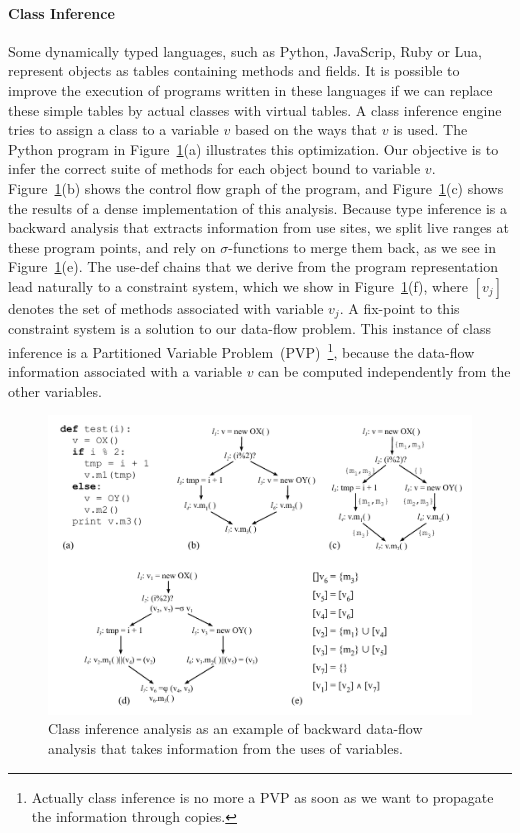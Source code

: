 \paragraph{Class Inference} Some dynamically typed languages, such as Python, Java\-Scrip, Ruby or Lua, represent objects as tables containing methods and fields.
It is possible to improve the execution of programs written in these languages if we can replace these simple tables by actual classes with virtual tables.
A class inference engine tries to assign a class to a variable $v$ based on the ways that $v$ is used.
The Python program in Figure~\ref{fig:classInference}(a) illustrates this optimization.
Our objective is to infer the correct suite of methods for each object bound to variable $v$.
Figure~\ref{fig:classInference}(b) shows the control flow graph of the program, and Figure~\ref{fig:classInference}(c) shows the results of a dense implementation of this analysis.
Because type inference is a backward analysis that extracts information from use sites, we split live ranges at these program points, and rely on $\sigma$-functions to merge them back, as we see in Figure~\ref{fig:classInference}(e).
The use-def chains that we derive from the program representation lead naturally to a constraint system, which we show in Figure~\ref{fig:classInference}(f), where $[v_j]$ denotes the set of methods associated with variable $v_j$.
A fix-point to this constraint system is a solution to our data-flow problem.
This instance of class inference is a Partitioned Variable Problem~(PVP)~\footnote{Actually class inference is no more a PVP as soon as we want to propagate the information through copies.}, because the data-flow information associated with a variable $v$ can be computed independently from the other variables.

\begin{figure}[t!]
\centering
\includegraphics[width=\linewidth]{classInference}
\caption{Class inference analysis as an example of backward data-flow analysis that takes information from the uses of variables.}
\label{fig:classInference}
\end{figure}


